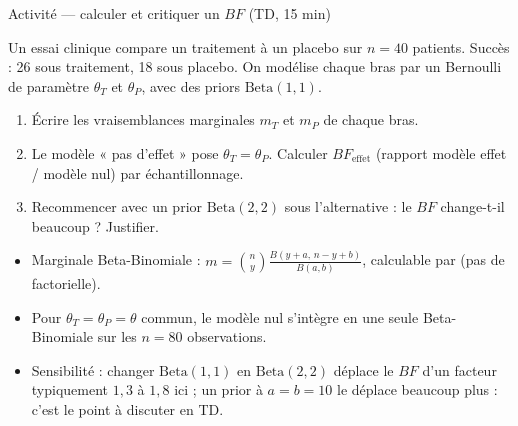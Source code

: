 \begin{frame}{Activité --- calculer et critiquer un $BF$ (TD, 15 min)}
\small
\begin{abox}
Un essai clinique compare un traitement à un placebo sur $n = 40$ patients.
Succès : 26 sous traitement, 18 sous placebo. On modélise chaque bras par un
Bernoulli de paramètre $\theta_T$ et $\theta_P$, avec des priors $\mathrm{Beta}(1,1)$.
\vspace{1mm}
\begin{enumerate}
  \item Écrire les vraisemblances marginales $m_T$ et $m_P$ de chaque bras.
  \item Le modèle « pas d'effet » pose $\theta_T = \theta_P$. Calculer $BF_{\text{effet}}$
        (rapport modèle effet / modèle nul) par échantillonnage.
  \item Recommencer avec un prior $\mathrm{Beta}(2,2)$ sous l'alternative :
        le $BF$ change-t-il beaucoup ? Justifier.
\end{enumerate}
\end{abox}
\vspace{1mm}
\begin{solbox}
\begin{itemize}
  \item Marginale Beta-Binomiale : $m = \binom{n}{y}\frac{B(y+a,\,n-y+b)}{B(a,b)}$,
        calculable par  (pas de factorielle).
  \item Pour $\theta_T = \theta_P = \theta$ commun, le modèle nul s'intègre en une seule
        Beta-Binomiale sur les $n = 80$ observations.
  \item Sensibilité : changer $\mathrm{Beta}(1,1)$ en $\mathrm{Beta}(2,2)$ déplace le $BF$
        d'un facteur typiquement $1{,}3$ à $1{,}8$ ici ; un prior à $a = b = 10$
        le déplace beaucoup plus : c'est le point à discuter en TD.
\end{itemize}
\end{solbox}
\end{frame}

